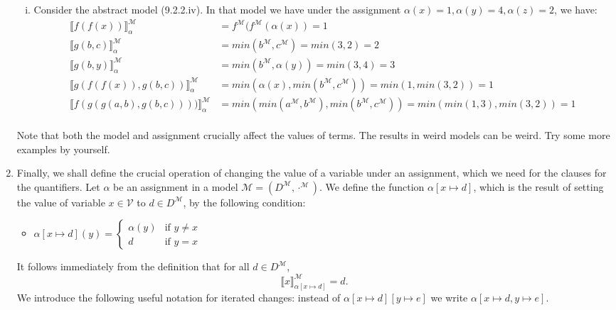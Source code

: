 \begin{enumerate}[\thesection.1]
\begin{enumerate}[(i)]
		  \item Consider the abstract model (9.2.2.iv).
			In that model we have under the assignment $\alpha(x)=1, \alpha(y)=4, \alpha(z)=2$, we have:
			\begin{align*}
			  \llbracket f(f(x))\rrbracket^\mathcal{M}_\alpha&=f^{\mathcal{M}}(f^{\mathcal{M}}(\alpha(x))=1\\
			  \llbracket g(b,c)\rrbracket^\mathcal{M}_\alpha&=min(b^\mathcal{M}, c^\mathcal{M})=min(3,2)=2\\
			  \llbracket g(b,y)\rrbracket^\mathcal{M}_\alpha&=min(b^\mathcal{M}, \alpha(y))=min(3,4)=3\\
			  \llbracket g(f(f(x)), g(b,c))\rrbracket^\mathcal{M}_\alpha&=min(\alpha(x), min(b^\mathcal{M}, c^\mathcal{M}))=min(1,min(3,2))=1\\
			  \llbracket f(g(g(a,b),g(b,c))))\rrbracket^\mathcal{M}_\alpha&=min(min(a^\mathcal{M}, b^\mathcal{M}), min(b^\mathcal{M}, c^\mathcal{M}))=min(min(1,3), min(3,2))=1\\
			\end{align*}

		\end{enumerate}
		Note that both the model and assignment crucially affect the values of terms.
		The results in weird models can be weird.
		Try some more examples by yourself.
		
		\item Finally, we shall define the crucial operation of changing the value of a variable under an assignment, which we need for the clauses for the quantifiers. Let $\alpha$ be an assignment in a model $\mathcal{M}=(D^\mathcal{M},\cdot^\mathcal{M})$. We define the function $\alpha[x\mapsto d]$, which is the result of setting the value of variable $x\in\mathcal{V}$ to $d\in D^\mathcal{M}$, by the following condition:
		
		\begin{itemize}
		
			\item $\alpha[x\mapsto d](y)=\begin{cases} \alpha(y) &\text{if }y\neq x\\ d & \text{if }y=x\end{cases}$
		
		\end{itemize}
		
		It follows immediately from the definition that for all  $d\in D^\mathcal{M}$, \[\llbracket x\rrbracket^\mathcal{M}_{\alpha[x\mapsto d]}=d.\] We introduce the following useful notation for iterated changes: instead of $\alpha[x\mapsto d][y\mapsto e]$ we write $\alpha[x\mapsto d, y\mapsto e]$.
		

\end{enumerate}
